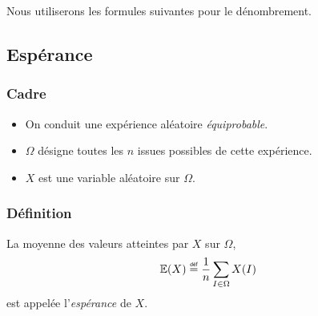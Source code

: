 \documentclass[main.tex]{subfiles}
\begin{document}
Nous utiliserons les formules suivantes pour le dénombrement.


\subsection{Espérance}

\begin{definition}

    \subsubsection{Cadre}
    \begin{itemize}
        \item On conduit une expérience aléatoire \emph{équiprobable}.
        \item $\Omega$ désigne toutes les $n$ issues possibles de cette expérience.
        \item $X$ est une variable aléatoire sur $\Omega$.
    \end{itemize}

    \subsubsection{Définition}
    La moyenne des valeurs atteintes par $X$ sur $\Omega$,
    \begin{align}
        \E(X) \defeq \frac 1 n \sum_{I \in \Omega} X(I)
    \end{align}
    est appelée l'\emph{espérance} de $X$.
\end{definition}
\end{document}
